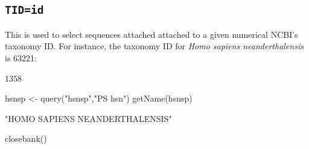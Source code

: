 \documentclass{article}
\begin{document}
\subsection{\texttt{TID=id}}

This is used to select sequences attached attached to a given numerical 
NCBI's taxonomy ID. For instance, the taxonomy ID for 
\textit{Homo sapiens neanderthalensis} is 63221:


\begin{Schunk}
\begin{Soutput}
[1] 1358
\end{Soutput}
\begin{Sinput}
 hsnsp <- query("hsnsp","PS hsn")
 getName(hsnsp)
\end{Sinput}
\begin{Soutput}
[1] "HOMO SAPIENS NEANDERTHALENSIS"
\end{Soutput}
\begin{Sinput}
 closebank()
\end{Sinput}
\end{Schunk}
\end{document}
